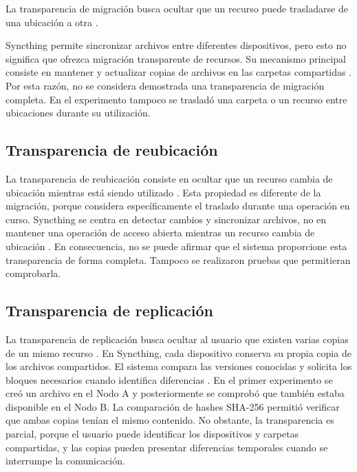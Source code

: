 \documentclass[12pt,a4paper]{article}
\begin{document}
La transparencia de migración busca ocultar que un recurso puede trasladarse de una ubicación a otra \cite{vansteen2023}.

Syncthing permite sincronizar archivos entre diferentes dispositivos, pero esto no significa que ofrezca migración transparente de recursos. Su mecanismo principal consiste en mantener 
y actualizar copias de archivos en las carpetas compartidas \cite{syncthingSyncing}.
Por esta razón, no se considera demostrada una transparencia de migración completa. 
En el experimento tampoco se trasladó una carpeta o un recurso entre ubicaciones durante su utilización.

\subsection{Transparencia de reubicación}

La transparencia de reubicación consiste en ocultar que un recurso cambia de ubicación mientras está siendo utilizado \cite{vansteen2023}.
Esta propiedad es diferente de la migración, porque considera específicamente el traslado durante una operación en curso. Syncthing se centra en detectar cambios y sincronizar archivos, 
no en mantener una operación de acceso abierta mientras un recurso cambia de ubicación \cite{syncthingSyncing}.
En consecuencia, no se puede afirmar que el sistema proporcione esta transparencia de forma completa. Tampoco se realizaron pruebas que permitieran comprobarla.

\subsection{Transparencia de replicación}

La transparencia de replicación busca ocultar al usuario que existen varias copias de un mismo recurso \cite{vansteen2023}.
En Syncthing, cada dispositivo conserva su propia copia de los archivos compartidos. El sistema compara las versiones conocidas y solicita los bloques necesarios cuando identifica diferencias \cite{syncthingSyncing}.
En el primer experimento se creó un archivo en el Nodo A y posteriormente se comprobó que también estaba disponible en el Nodo B. La comparación de hashes SHA-256 permitió verificar que ambas copias tenían el mismo contenido.
No obstante, la transparencia es parcial, porque el usuario puede identificar los dispositivos y carpetas compartidas, y las copias pueden presentar diferencias temporales cuando se interrumpe la comunicación.
\end{document}
